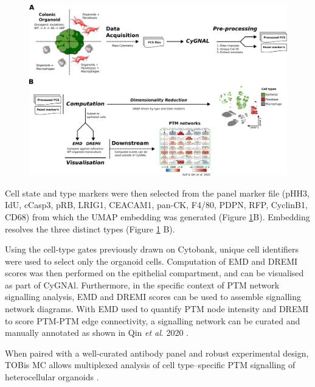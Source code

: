 \begin{figure}
    \centering
    \includegraphics{03cytof/figs/3CYGNAL_usage.png}
    \caption{}
    \label{fig:3cyguse}
\end{figure}

Cell state and type markers were then selected from the panel marker file (pHH3, IdU, cCasp3, pRB, LRIG1, CEACAM1, pan-CK, F4/80, PDPN, RFP, CyclinB1, CD68) from which the UMAP embedding was generated (Figure \ref{fig:3cyguse}B). Embedding resolves the three distinct types (Figure \ref{fig:3cyguse} B).

Using the cell-type gates previously drawn on Cytobank, unique cell identifiers were used to select only the organoid cells. Computation of EMD and DREMI scores was then performed on the epithelial compartment, and can be visualised as part of CyGNAl. Furthermore, in the specific context of PTM network signalling analysis, EMD and DREMI scores can be used to assemble signalling network diagrams. With EMD used to quantify PTM node intensity and DREMI to score PTM-PTM edge connectivity, a signalling network can be curated and manually annotated as shown in Qin \textit{et al}. 2020 \cite{qin_cell-type-specific_2020}. 

When paired with a well-curated antibody panel and robust experimental design, TOBis MC allows multiplexed analysis of cell type–specific PTM signalling of heterocellular organoids \cite{sufi_multiplexed_2021}. 

